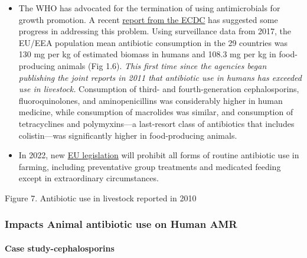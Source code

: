 \documentclass[]{tufte-handout}
\begin{document}
\begin{itemize}
{  with acceptable risk in humans.} While MRLs are well-understood and
  enforced withtesting programs and penalties, these programs do not
  take into account selection of antimicrobial-resistant pathogens.
\item
  The WHO has advocated for the termination of using antimicrobials for
  growth promotion. A recent
  \href{https://www.ecdc.europa.eu/sites/default/files/documents/JIACRA-III-Antimicrobial-Consumption-and-Resistance-in-Bacteria-from-Humans-and-Animals.pdf}{report
  from the ECDC} has suggested some progress in addressing this problem.
  Using surveillance data from 2017, the EU/EEA population mean
  antibiotic consumption in the 29 countries was 130 mg per kg of
  estimated biomass in humans and 108.3 mg per kg in food-producing
  animals (Fig 1.6). \emph{This first time since the agencies began
  publishing the joint reports in 2011 that antibiotic use in humans has
  exceeded use in livestock.} Consumption of third- and
  fourth-generation cephalosporins, fluoroquinolones, and
  aminopenicillins was considerably higher in human medicine, while
  consumption of macrolides was similar, and consumption of
  tetracyclines and polymyxins---a last-resort class of antibiotics that
  includes colistin---was significantly higher in food-producing
  animals.
\item
  In 2022, new
  \href{https://eur-lex.europa.eu/legal-content/EN/TXT/PDF/?uri=CELEX:32019R0006\&from=EN}{EU
  legislation} will prohibit all forms of routine antibiotic use in
  farming, including preventative group treatments and medicated feeding
  except in extraordinary circumstances.
\end{itemize}

Figure 7. Antibiotic use in livestock reported in 2010

\hypertarget{impacts-animal-antibiotic-use-on-human-amr}{%
\subsubsection*{Impacts Animal antibiotic use on Human
AMR}\label{impacts-animal-antibiotic-use-on-human-amr}}

\hypertarget{case-study-cephalosporins}{%
\paragraph*{Case study-cephalosporins}\label{case-study-cephalosporins}}
\end{document}

